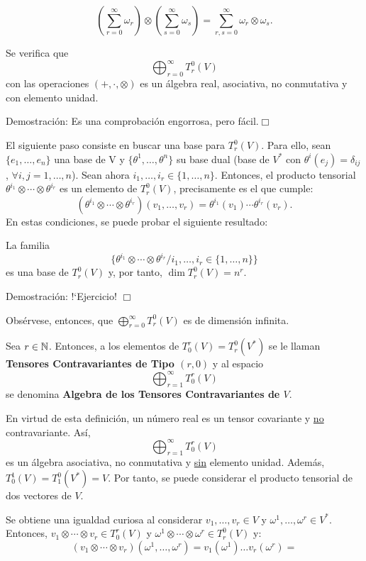 \documentclass[cursovd_portada.tex]{subfiles}
\begin{document}
$$\left(\sum_{r=0}^\infty\omega_r\right)\otimes\left(\sum_{s=0}^\infty\omega_s\right)=\sum_{r,s=0}^
\infty\omega_r\otimes\omega_s.$$
\begin{propoap} Se verifica que
$$\bigoplus_{r=0}^\infty T^0_r(V)$$
con las operaciones $(+,\cdot,\otimes)$ es un álgebra real, asociativa, no conmutativa y con elemento unidad.
\end{propoap}
{\sc Demostración:} Es una comprobación engorrosa, pero fácil.\hfill$\Box$
\par\bigskip
El siguiente paso consiste en buscar una base para $T^0_r(V)$. Para ello, sean $\{e_1,\dots ,e_n\}$ una base de V
y $\{\theta^1,\dots ,\theta^n\}$ su base dual (base de $V^*$ con $\theta^i(e_j)=\delta_{ij}$, $\forall i,j=1,\dots
, n$). Sean ahora $i_1,\dots ,i_r\in \{1,\dots, n\}$. Entonces, el producto tensorial
$\theta^{i_1}\otimes\cdots\otimes\theta^{i_r}$ es un elemento de $T^0_r(V)$, precisamente es el que cumple:
$$(\theta^{i_1}\otimes\cdots\otimes\theta^{i_r})(v_1,\dots,v_r)
=\theta^{i_1}(v_1)\cdots\theta^{i_r}(v_r).$$ En estas condiciones, se puede probar el siguiente resultado:
\begin{propoap}
La familia
$$\{\theta^{i_1}\otimes\cdots\otimes\theta^{i_r}/i_1,\dots ,i_r\in\{1,\dots,
n\}\}$$ es una base de $T^0_r(V)$ y, por tanto, $\dim T^0_r(V)=n^r$.
\end{propoap}
{\sc Demostración:} !`Ejercicio! \hfill$\Box$
\par\bigskip
Obsérvese, entonces, que $\bigoplus_{r=0}^{\infty}T^0_r(V)$ es de dimensión infinita.
\begin{defiap}
Sea $r\in\mathbb{N}$. Entonces, a los elementos de $T^r_0(V) = T^0_r(V^*)$ se le llaman {\bf Tensores Contravariantes de
Tipo $(r,0)$} y al espacio
$$\bigoplus_{r=1}^\infty T^r_0(V)$$
se denomina {\bf Algebra de los Tensores Contravariantes de $V$}.
\end{defiap}
\par\bigskip
En virtud de esta definición, un número real es un tensor covariante y \underline{no} contravariante. Así,
$$\bigoplus_{r=1}^{\infty} T^r_0(V)$$
es un álgebra asociativa, no conmutativa y \underline{sin} elemento unidad. Además, $T^1_0(V) =T^0_1(V^*) =V$. Por
tanto, se puede considerar el producto tensorial de dos vectores de $V$.
\par
Se obtiene una igualdad curiosa al considerar $v_1,\dots ,v_r \in V$ y $\omega^1,\dots ,\omega^r\in V^*$.
Entonces, $v_1\otimes\cdots\otimes v_r\in T^r_0(V)$ y $\omega^1\otimes\cdots\otimes\omega^r\in T^0_r(V)$ y:
$$(v_1\otimes\cdots\otimes v_r)(\omega^1,\dots ,\omega^r)=
v_1(\omega^1)\dots v_r(\omega^r)=$$
\end{document}
